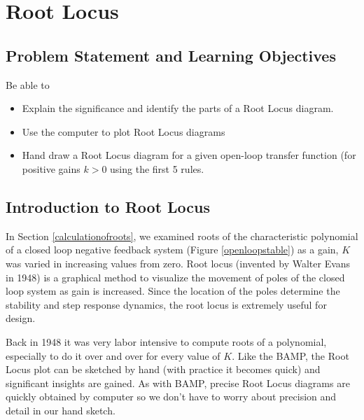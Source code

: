 %
%
%

\chapter{Root Locus}\label{RootLocusChapter}

\section{Problem Statement and Learning Objectives}

Be able to
\begin{itemize}

  \item Explain the significance and identify the parts of a Root Locus diagram.
  \item Use the computer to plot Root Locus diagrams
  \item Hand draw  a Root Locus diagram for a given open-loop  transfer
  function (for positive gains  $k>0$ using the first 5 rules.
\end{itemize}





\section{Introduction to Root Locus}

In Section \ref{calculationofroots}, we examined roots of the characteristic polynomial of a closed loop negative feedback system (Figure \ref{openloopstable}) as a gain, $K$ was varied in increasing values from zero.    Root locus (invented by Walter Evans in 1948) is a graphical method to visualize the movement of poles of the closed loop system as gain is increased.   Since the location of the poles determine the stability  and step response dynamics, the root locus is extremely useful for design.

Back in 1948 it was very labor intensive to compute roots of a polynomial, especially to do it over and over for every value of $K$.   Like the BAMP, the Root Locus plot can be sketched by hand (with practice it becomes quick) and significant insights are gained.   As with BAMP, precise Root Locus diagrams are quickly obtained by computer so we don't have to worry about precision and detail in our hand sketch.









